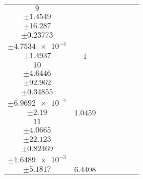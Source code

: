 \documentclass[8pt]{article}
\begin{document}
\begin{longtable}[l]{c c c c c c c}
$\num{9}$ & \begin{tabular}[c]{@{}c@{}}$\num{2.8627}$ \\ $\pm\num{1.4549}$\end{tabular} & \begin{tabular}[c]{@{}c@{}}$\num{4.9519e-2}$ \\ $\pm\num{16.287}$\end{tabular} & \begin{tabular}[c]{@{}c@{}}$\num{2.6266e+3}$ \\ $\pm\num{0.23773}$\end{tabular} & \begin{tabular}[c]{@{}c@{}}$\num{5.2517}$ \\ $\pm\num{4.7534e-4}$\end{tabular} & \begin{tabular}[c]{@{}c@{}}$\num{4.9561}$ \\ $\pm\num{1.4937}$\end{tabular} & $\num{1}$\\
$\num{10}$ & \begin{tabular}[c]{@{}c@{}}$\num{3.0292}$ \\ $\pm\num{4.6446}$\end{tabular} & \begin{tabular}[c]{@{}c@{}}$\num{2.1887e-2}$ \\ $\pm\num{92.962}$\end{tabular} & \begin{tabular}[c]{@{}c@{}}$\num{2.6299e+3}$ \\ $\pm\num{0.34855}$\end{tabular} & \begin{tabular}[c]{@{}c@{}}$\num{5.2584}$ \\ $\pm\num{6.9692e-4}$\end{tabular} & \begin{tabular}[c]{@{}c@{}}$\num{5.5097}$ \\ $\pm\num{2.19}$\end{tabular} & $\num{1.0459}$\\
$\num{11}$ & \begin{tabular}[c]{@{}c@{}}$\num{19.256}$ \\ $\pm\num{4.0665}$\end{tabular} & \begin{tabular}[c]{@{}c@{}}$\num{-0.35213}$ \\ $\pm\num{22.123}$\end{tabular} & \begin{tabular}[c]{@{}c@{}}$\num{2.6365e+3}$ \\ $\pm\num{0.82469}$\end{tabular} & \begin{tabular}[c]{@{}c@{}}$\num{5.2716}$ \\ $\pm\num{1.6489e-3}$\end{tabular} & \begin{tabular}[c]{@{}c@{}}$\num{7.3065}$ \\ $\pm\num{5.1817}$\end{tabular} & $\num{6.4408}$\\
\bottomrule
\end{longtable}
\end{document}
